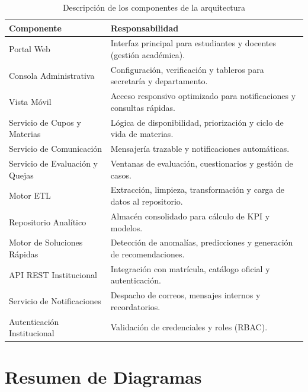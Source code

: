 \begin{table}[H]
\centering
\caption{Descripción de los componentes de la arquitectura}
\label{tab:componentes}
\small
\begin{tabularx}{\textwidth}{@{}l X@{}}
\toprule
\rowcolor{azulClaro}
\textbf{Componente} & \textbf{Responsabilidad} \\
\midrule
Portal Web & Interfaz principal para estudiantes y docentes (gestión académica). \\
Consola Administrativa & Configuración, verificación y tableros para secretaría y departamento. \\
Vista Móvil & Acceso responsivo optimizado para notificaciones y consultas rápidas. \\
Servicio de Cupos y Materias & Lógica de disponibilidad, priorización y ciclo de vida de materias. \\
Servicio de Comunicación & Mensajería trazable y notificaciones automáticas. \\
Servicio de Evaluación y Quejas & Ventanas de evaluación, cuestionarios y gestión de casos. \\
Motor \ac{ETL} & Extracción, limpieza, transformación y carga de datos al repositorio. \\
Repositorio Analítico & Almacén consolidado para cálculo de \ac{KPI} y modelos. \\
Motor de Soluciones Rápidas & Detección de anomalías, predicciones y generación de recomendaciones. \\
\ac{API} \ac{REST} Institucional & Integración con matrícula, catálogo oficial y autenticación. \\
Servicio de Notificaciones & Despacho de correos, mensajes internos y recordatorios. \\
Autenticación Institucional & Validación de credenciales y roles (\ac{RBAC}). \\
\bottomrule
\end{tabularx}
\end{table}

\section{Resumen de Diagramas}

